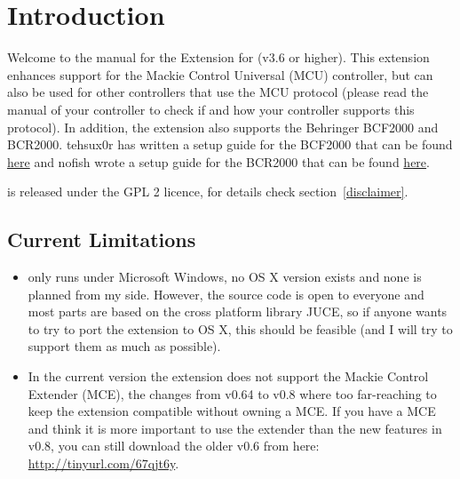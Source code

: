 \section{Introduction}

Welcome to the manual for the \mcu Extension for \reaper (v3.6 or
higher). This extension enhances support for the Mackie Control
Universal (MCU) controller, but can also be used for other controllers
that use the MCU protocol (please read the manual of your
controller to check if and how your controller supports this
protocol). In addition, the extension also supports the Behringer
BCF2000 and BCR2000. tehsux0r has written a setup guide for the
BCF2000 that can be found
\href{http://forum.cockos.com/showthread.php?t=117909}{here}
and nofish wrote a setup guide for the BCR2000 that can be found
\href{http://forum.cockos.com/showthread.php?t=60110}{here}.

\mcu is released under the GPL 2 licence, for details check
section~\ref{disclaimer}.

\subsection{Current Limitations}
\begin{itemize}
\item \mcu only runs under Microsoft Windows, no OS X version exists
  and none is planned from my side. However, the source code is open to
  everyone and most parts are based on the cross platform library
  JUCE, so if anyone wants to try to port the extension to OS X, this
  should be feasible (and I will try to support them as much as
  possible).

\item In the current version the extension does not support the Mackie
  Control Extender (MCE), the changes from v0.64 to v0.8 where too
  far-reaching to keep the extension compatible without owning a
  MCE. 
  If you have a MCE and think
  it is more important to use the extender than the new features in
  v0.8, you can still download the older v0.6 from here:
  \url{http://tinyurl.com/67qjt6y}.

\end{itemize}

% 

